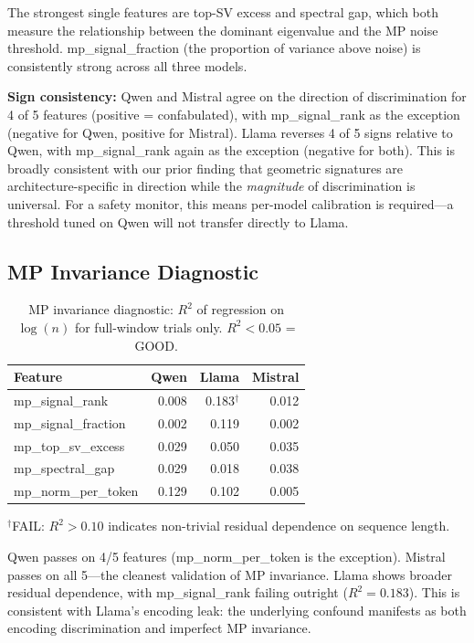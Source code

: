 The strongest single features are top-SV excess and spectral gap, which
both measure the relationship between the dominant eigenvalue and the
MP noise threshold. mp\_signal\_fraction (the proportion of variance
above noise) is consistently strong across all three models.

\textbf{Sign consistency:} Qwen and Mistral agree on the direction of
discrimination for 4 of 5 features (positive = confabulated), with
mp\_signal\_rank as the exception (negative for Qwen, positive for
Mistral). Llama reverses 4 of 5 signs relative to Qwen, with
mp\_signal\_rank again as the exception (negative for both). This is
broadly consistent with our prior finding that geometric signatures are
architecture-specific in direction while the \emph{magnitude} of
discrimination is universal. For a safety monitor, this means per-model
calibration is required---a threshold tuned on Qwen will not transfer
directly to Llama.

\subsection{MP Invariance Diagnostic}

\begin{table}[H]
\centering
\caption{MP invariance diagnostic: $R^2$ of regression on $\log(n)$ for
  full-window trials only. $R^2 < 0.05$ = GOOD.}
\label{tab:mp_invariance}
\begin{tabular}{lrrr}
\toprule
Feature & Qwen & Llama & Mistral \\
\midrule
mp\_signal\_rank      & 0.008 & 0.183$^{\dagger}$ & 0.012 \\
mp\_signal\_fraction  & 0.002 & 0.119 & 0.002 \\
mp\_top\_sv\_excess   & 0.029 & 0.050 & 0.035 \\
mp\_spectral\_gap     & 0.029 & 0.018 & 0.038 \\
mp\_norm\_per\_token  & 0.129 & 0.102 & 0.005 \\
\bottomrule
\end{tabular}
{\small $^{\dagger}$FAIL: $R^2 > 0.10$ indicates non-trivial residual
  dependence on sequence length.}
\end{table}

Qwen passes on 4/5 features (mp\_norm\_per\_token is the exception).
Mistral passes on all 5---the cleanest validation of MP invariance.
Llama shows broader residual dependence, with mp\_signal\_rank failing
outright ($R^2 = 0.183$). This is consistent with Llama's encoding leak:
the underlying confound manifests as both encoding discrimination and
imperfect MP invariance.

